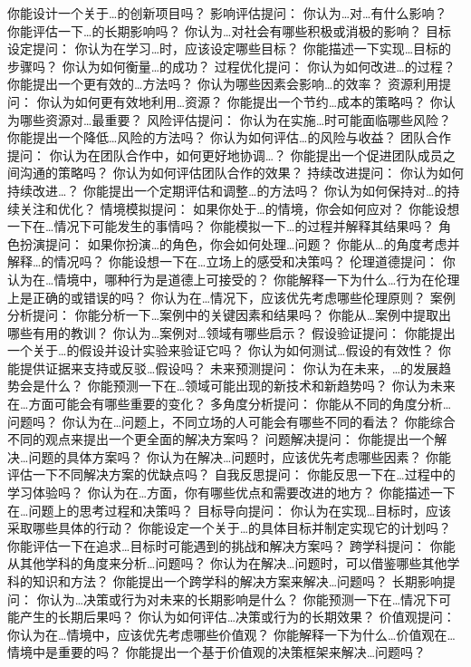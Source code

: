 \documentclass[12pt]{book}
\begin{document}
你能设计一个关于…的创新项目吗？
影响评估提问：
你认为…对…有什么影响？
你能评估一下…的长期影响吗？
你认为…对社会有哪些积极或消极的影响？
目标设定提问：
你认为在学习…时，应该设定哪些目标？
你能描述一下实现…目标的步骤吗？
你认为如何衡量…的成功？
过程优化提问：
你认为如何改进…的过程？
你能提出一个更有效的…方法吗？
你认为哪些因素会影响…的效率？
资源利用提问：
你认为如何更有效地利用…资源？
你能提出一个节约…成本的策略吗？
你认为哪些资源对…最重要？
风险评估提问：
你认为在实施…时可能面临哪些风险？
你能提出一个降低…风险的方法吗？
你认为如何评估…的风险与收益？
团队合作提问：
你认为在团队合作中，如何更好地协调…？
你能提出一个促进团队成员之间沟通的策略吗？
你认为如何评估团队合作的效果？
持续改进提问：
你认为如何持续改进…？
你能提出一个定期评估和调整…的方法吗？
你认为如何保持对…的持续关注和优化？
情境模拟提问：
如果你处于…的情境，你会如何应对？
你能设想一下在…情况下可能发生的事情吗？
你能模拟一下…的过程并解释其结果吗？
角色扮演提问：
如果你扮演…的角色，你会如何处理…问题？
你能从…的角度考虑并解释…的情况吗？
你能设想一下在…立场上的感受和决策吗？
伦理道德提问：
你认为在…情境中，哪种行为是道德上可接受的？
你能解释一下为什么…行为在伦理上是正确的或错误的吗？
你认为在…情况下，应该优先考虑哪些伦理原则？
案例分析提问：
你能分析一下…案例中的关键因素和结果吗？
你能从…案例中提取出哪些有用的教训？
你认为…案例对…领域有哪些启示？
假设验证提问：
你能提出一个关于…的假设并设计实验来验证它吗？
你认为如何测试…假设的有效性？
你能提供证据来支持或反驳…假设吗？
未来预测提问：
你认为在未来，…的发展趋势会是什么？
你能预测一下在…领域可能出现的新技术和新趋势吗？
你认为未来在…方面可能会有哪些重要的变化？
多角度分析提问：
你能从不同的角度分析…问题吗？
你认为在…问题上，不同立场的人可能会有哪些不同的看法？
你能综合不同的观点来提出一个更全面的解决方案吗？
问题解决提问：
你能提出一个解决…问题的具体方案吗？
你认为在解决…问题时，应该优先考虑哪些因素？
你能评估一下不同解决方案的优缺点吗？
自我反思提问：
你能反思一下在…过程中的学习体验吗？
你认为在…方面，你有哪些优点和需要改进的地方？
你能描述一下在…问题上的思考过程和决策吗？
目标导向提问：
你认为在实现…目标时，应该采取哪些具体的行动？
你能设定一个关于…的具体目标并制定实现它的计划吗？
你能评估一下在追求…目标时可能遇到的挑战和解决方案吗？
跨学科提问：
你能从其他学科的角度来分析…问题吗？
你认为在解决…问题时，可以借鉴哪些其他学科的知识和方法？
你能提出一个跨学科的解决方案来解决…问题吗？
长期影响提问：
你认为…决策或行为对未来的长期影响是什么？
你能预测一下在…情况下可能产生的长期后果吗？
你认为如何评估…决策或行为的长期效果？
价值观提问：
你认为在…情境中，应该优先考虑哪些价值观？
你能解释一下为什么…价值观在…情境中是重要的吗？
你能提出一个基于价值观的决策框架来解决…问题吗？
\end{document}
